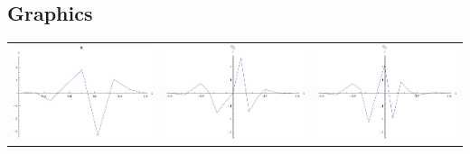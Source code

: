 \documentclass{article}
\begin{document}
\begin{landscape}
\subsection{Graphics}
\begin{tabular}{ccc}
\includegraphics[width=6.7cm]{linear_wavelet_1.pdf}& \includegraphics[width=6.7cm]{linear_wavelet_2.pdf}& \includegraphics[width=6.7cm]{linear_wavelet_3.pdf} \\
\end{tabular} 
 \end{landscape}
\end{document}
